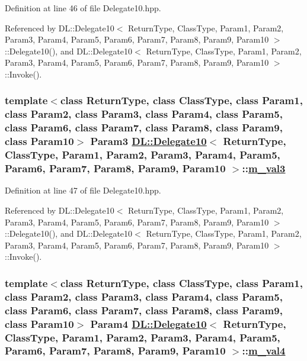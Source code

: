 Definition at line 46 of file Delegate10.hpp.

Referenced by DL::Delegate10$<$ Return\-Type, Class\-Type, Param1, Param2, Param3, Param4, Param5, Param6, Param7, Param8, Param9, Param10 $>$::Delegate10(), and DL::Delegate10$<$ Return\-Type, Class\-Type, Param1, Param2, Param3, Param4, Param5, Param6, Param7, Param8, Param9, Param10 $>$::Invoke().\hypertarget{classDL_1_1Delegate10_r4}{
\subsubsection[m\_\-val3]{\setlength{\rightskip}{0pt plus 5cm}template$<$class Return\-Type, class Class\-Type, class Param1, class Param2, class Param3, class Param4, class Param5, class Param6, class Param7, class Param8, class Param9, class Param10$>$ Param3 \hyperlink{classDL_1_1Delegate10}{DL::Delegate10}$<$ Return\-Type, Class\-Type, Param1, Param2, Param3, Param4, Param5, Param6, Param7, Param8, Param9, Param10 $>$::\hyperlink{classDL_1_1Delegate10_r4}{m\_\-val3}}}
\label{classDL_1_1Delegate10_r4}




Definition at line 47 of file Delegate10.hpp.

Referenced by DL::Delegate10$<$ Return\-Type, Class\-Type, Param1, Param2, Param3, Param4, Param5, Param6, Param7, Param8, Param9, Param10 $>$::Delegate10(), and DL::Delegate10$<$ Return\-Type, Class\-Type, Param1, Param2, Param3, Param4, Param5, Param6, Param7, Param8, Param9, Param10 $>$::Invoke().\hypertarget{classDL_1_1Delegate10_r5}{
\subsubsection[m\_\-val4]{\setlength{\rightskip}{0pt plus 5cm}template$<$class Return\-Type, class Class\-Type, class Param1, class Param2, class Param3, class Param4, class Param5, class Param6, class Param7, class Param8, class Param9, class Param10$>$ Param4 \hyperlink{classDL_1_1Delegate10}{DL::Delegate10}$<$ Return\-Type, Class\-Type, Param1, Param2, Param3, Param4, Param5, Param6, Param7, Param8, Param9, Param10 $>$::\hyperlink{classDL_1_1Delegate10_r5}{m\_\-val4}}}
\label{classDL_1_1Delegate10_r5}




